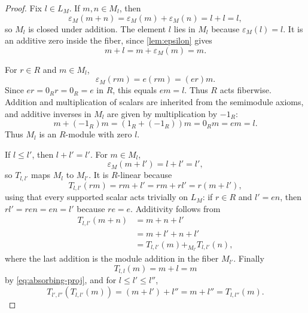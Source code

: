 \documentclass[11pt]{article}
\newcommand{\eps}{\varepsilon}
\newcommand{\1}{\mathbf 1}
\numberwithin{equation}{section}
\begin{document}
\begin{proof}
Fix $l\in L_M$.  If $m,n\in M_l$, then
\begin{equation}
  \eps_M(m+n)=\eps_M(m)+\eps_M(n)=l+l=l,
\end{equation}
so $M_l$ is closed under addition.  The element $l$ lies in $M_l$ because $\eps_M(l)=l$.  It is an additive zero inside the fiber, since \cref{lem:epsilon} gives
\begin{equation}
  m+l=m+\eps_M(m)=m.
\end{equation}

For $r\in R$ and $m\in M_l$,
\begin{equation}
  \eps_M(rm)=e(rm)=(er)m.
\end{equation}
Since $er=0_R r=0_R=e$ in $R$, this equals $em=l$.  Thus $R$ acts fiberwise.  Addition and multiplication of scalars are inherited from the semimodule axioms, and additive inverses in $M_l$ are given by multiplication by $-1_R$:
\begin{equation}
  m+(-1_R)m=(1_R+(-1_R))m=0_Rm=em=l.
\end{equation}
Thus $M_l$ is an $R$-module with zero $l$.

If $l\le l'$, then $l+l'=l'$.  For $m\in M_l$,
\begin{equation}
  \eps_M(m+l')=l+l'=l',
\end{equation}
so $T_{l,l'}$ maps $M_l$ to $M_{l'}$.  It is $R$-linear because
\begin{equation}
  T_{l,l'}(rm)=rm+l'=rm+rl'=r(m+l'),
\end{equation}
using that every supported scalar acts trivially on $L_M$: if $r\in R$ and $l'=en$, then $rl'=ren=en=l'$ because $re=e$.  Additivity follows from
\begin{align}
  T_{l,l'}(m+n)&=m+n+l'\nonumber\\
  &=m+l'+n+l'\nonumber\\
  &=T_{l,l'}(m)+_{M_{l'}}T_{l,l'}(n),
\end{align}
where the last addition is the module addition in the fiber $M_{l'}$.  Finally
\begin{equation}
  T_{l,l}(m)=m+l=m
\end{equation}
by \eqref{eq:absorbing-proj}, and for $l\le l'\le l''$,
\begin{equation}
  T_{l',l''}(T_{l,l'}(m))=(m+l')+l''=m+l''=T_{l,l''}(m).
\end{equation}
\end{proof}
\end{document}
